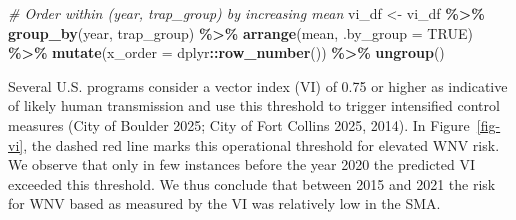 \documentclass[
  letterpaper,
]{krantz}
\newenvironment{Shaded}{\begin{snugshade}}{\end{snugshade}}
\newcommand{\AttributeTok}[1]{\textcolor[rgb]{0.13,0.29,0.53}{#1}}
\newcommand{\CommentTok}[1]{\textcolor[rgb]{0.56,0.35,0.01}{\textit{#1}}}
\newcommand{\ConstantTok}[1]{\textcolor[rgb]{0.56,0.35,0.01}{#1}}
\newcommand{\FunctionTok}[1]{\textcolor[rgb]{0.13,0.29,0.53}{\textbf{#1}}}
\newcommand{\NormalTok}[1]{#1}
\newcommand{\OtherTok}[1]{\textcolor[rgb]{0.56,0.35,0.01}{#1}}
\newcommand{\SpecialCharTok}[1]{\textcolor[rgb]{0.81,0.36,0.00}{\textbf{#1}}}
\begin{document}
\begin{Shaded}
\begin{Highlighting}[]
\CommentTok{\# Order within (year, trap\_group) by increasing mean}
\NormalTok{vi\_df }\OtherTok{\textless{}{-}}\NormalTok{ vi\_df }\SpecialCharTok{\%\textgreater{}\%}
  \FunctionTok{group\_by}\NormalTok{(year, trap\_group) }\SpecialCharTok{\%\textgreater{}\%}
  \FunctionTok{arrange}\NormalTok{(mean, }\AttributeTok{.by\_group =} \ConstantTok{TRUE}\NormalTok{) }\SpecialCharTok{\%\textgreater{}\%}
  \FunctionTok{mutate}\NormalTok{(}\AttributeTok{x\_order =}\NormalTok{ dplyr}\SpecialCharTok{::}\FunctionTok{row\_number}\NormalTok{()) }\SpecialCharTok{\%\textgreater{}\%}
  \FunctionTok{ungroup}\NormalTok{()}
\end{Highlighting}
\end{Shaded}

Several U.S. programs consider a vector index (VI) of 0.75 or higher as
indicative of likely human transmission and use this threshold to
trigger intensified control measures (City of Boulder 2025; City of Fort
Collins 2025, 2014). In Figure~\ref{fig-vi}, the dashed red line marks
this operational threshold for elevated WNV risk. We observe that only
in few instances before the year 2020 the predicted VI exceeded this
threshold. We thus conclude that between 2015 and 2021 the risk for WNV
based as measured by the VI was relatively low in the SMA.
\end{document}
